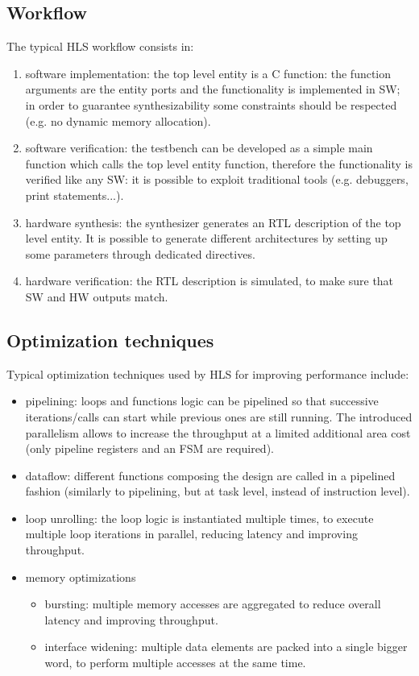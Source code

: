 \documentclass[11pt,a4paper]{memoir}
\begin{document}
\subsection{Workflow}
The typical HLS workflow consists in:
\begin{enumerate}
	\item software implementation: the top level entity is a C function:
		the function arguments are the entity ports and the functionality
		is implemented in SW; in order to guarantee synthesizability
		some constraints should be respected (e.g. no dynamic memory
		allocation).
	\item software verification: the testbench can be developed as a simple
		main function which calls the top level entity function,
		therefore the functionality is verified like any SW:
		it is possible to exploit traditional tools (e.g. debuggers,
		print statements...).
	\item hardware synthesis: the synthesizer generates an RTL description
		of the top level entity. It is possible to generate different
		architectures by setting up some parameters through dedicated
		directives.
	\item hardware verification: the RTL description is simulated, to make
		sure that SW and HW outputs match.
\end{enumerate}

\subsection{Optimization techniques}
Typical optimization techniques used by HLS for improving performance include:
\begin{itemize}
	\item pipelining: loops and functions logic can be pipelined so that
		successive iterations/calls can start while previous ones are
		still running. The introduced parallelism allows to increase
		the throughput at a limited additional area cost (only pipeline
		registers and an FSM are required).
	\item dataflow: different functions composing the design are called in
		a pipelined fashion (similarly to pipelining, but at task level,
		instead of instruction level).
	\item loop unrolling: the loop logic is instantiated multiple times,
		to execute multiple loop iterations in parallel, reducing latency
		and improving throughput.
	\item memory optimizations
		\begin{itemize}
			\item bursting: multiple memory accesses are aggregated
				to reduce overall latency and improving throughput.
			\item interface widening: multiple data elements are
				packed into a single bigger word, to perform
				multiple accesses at the same time.
		\end{itemize}
\end{itemize}
\end{document}
